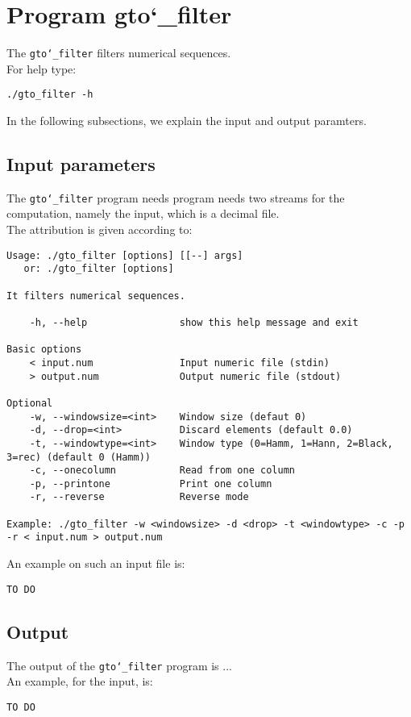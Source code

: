 \section{Program gto\char`_filter}
The \texttt{gto\char`_filter} filters numerical sequences.\\
For help type:
\begin{lstlisting}
./gto_filter -h
\end{lstlisting}
In the following subsections, we explain the input and output paramters.

\subsection*{Input parameters}

The \texttt{gto\char`_filter} program needs program needs two streams for the computation, namely the input, which is a decimal file.\\
The attribution is given according to:
\begin{lstlisting}
Usage: ./gto_filter [options] [[--] args]
   or: ./gto_filter [options]

It filters numerical sequences.

    -h, --help                show this help message and exit

Basic options
    < input.num               Input numeric file (stdin)
    > output.num              Output numeric file (stdout)

Optional
    -w, --windowsize=<int>    Window size (defaut 0)
    -d, --drop=<int>          Discard elements (default 0.0)
    -t, --windowtype=<int>    Window type (0=Hamm, 1=Hann, 2=Black, 3=rec) (default 0 (Hamm))
    -c, --onecolumn           Read from one column
    -p, --printone            Print one column
    -r, --reverse             Reverse mode

Example: ./gto_filter -w <windowsize> -d <drop> -t <windowtype> -c -p -r < input.num > output.num
\end{lstlisting}
An example on such an input file is:
\begin{lstlisting}
TO DO
\end{lstlisting}

\subsection*{Output}
The output of the \texttt{gto\char`_filter} program is ...\\
An example, for the input, is:
\begin{lstlisting}
TO DO
\end{lstlisting}